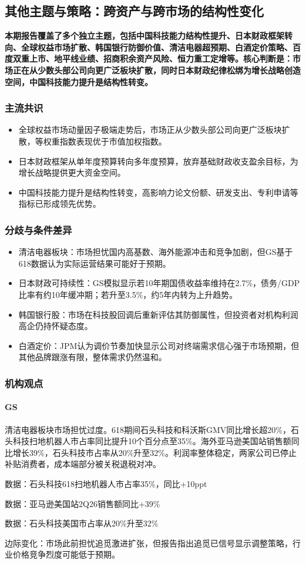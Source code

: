 \documentclass[11pt]{ctexart}
\begin{document}
\subsection{其他主题与策略：跨资产与跨市场的结构性变化}
\textbf{本期报告覆盖了多个独立主题，包括中国科技能力结构性提升、日本财政框架转向、全球权益市场扩散、韩国银行防御价值、清洁电器超预期、白酒定价策略、百度双重上市、地平线业绩、招商积余资产风险、恒力重工定增等。核心判断是：市场正在从少数头部公司向更广泛板块扩散，同时日本财政纪律松绑为增长战略创造空间，中国科技能力提升是结构性转变。}
\subsubsection*{主流共识}
\begin{itemize}
  \item 全球权益市场动量因子极端走势后，市场正从少数头部公司向更广泛板块扩散，等权重指数表现优于市值加权指数。
  \item 日本财政框架从单年度预算转向多年度预算，放弃基础财政收支盈余目标，为增长战略提供更大资金空间。
  \item 中国科技能力提升是结构性转变，高影响力论文份额、研发支出、专利申请等指标已形成领先优势。
\end{itemize}
\subsubsection*{分歧与条件差异}
\begin{itemize}
  \item 清洁电器板块：市场担忧国内高基数、海外能源冲击和竞争加剧，但GS基于618数据认为实际运营结果可能好于预期。
  \item 日本财政可持续性：GS模拟显示若10年期国债收益率维持在2.7\%，债务/GDP比率有约10年缓冲期；若升至3.5\%，约5年内转为上升趋势。
  \item 韩国银行股：市场在科技股回调后重新评估其防御属性，但投资者对机构利润高企仍持怀疑态度。
  \item 白酒定价：JPM认为调价节奏加快显示公司对终端需求信心强于市场预期，但其他品牌跟涨有限，整体需求仍然温和。
\end{itemize}
\subsubsection*{机构观点}
\paragraph{GS} 清洁电器板块市场担忧过度。618期间石头科技和科沃斯GMV同比增长超20\%，石头科技扫地机器人市占率同比提升10个百分点至35\%。海外亚马逊美国站销售额同比增长39\%，石头科技市占率从20\%升至32\%。利润率整体稳定，两家公司已停止补贴消费者，成本端部分被关税退税对冲。
{\small\color{refgray}数据：石头科技618扫地机器人市占率35\%，同比+10ppt\par}
{\small\color{refgray}数据：亚马逊美国站2Q26销售额同比+39\%\par}
{\small\color{refgray}数据：石头科技美国市占率从20\%升至32\%\par}
{\small\color{refgray}边际变化：市场此前担忧追觅激进扩张，但报告指出追觅已信号显示调整策略，行业价格竞争烈度可能低于预期。\par}
\end{document}
